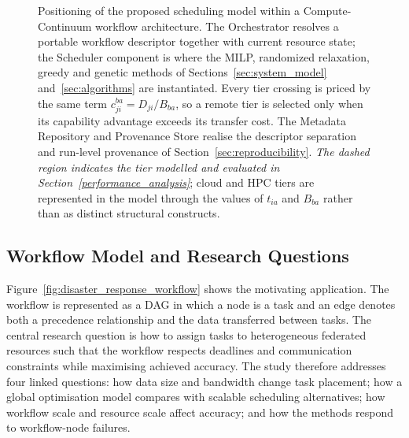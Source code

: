 \begin{figure}[t]
\caption{Positioning of the proposed scheduling model within a Compute-Continuum workflow
architecture. The Orchestrator resolves a portable workflow descriptor together with current
resource state; the Scheduler component is where the MILP, randomized relaxation, greedy and
genetic methods of Sections~\ref{sec:system_model} and~\ref{sec:algorithms} are instantiated.
Every tier crossing is priced by the same term $c_{ji}^{ba}=D_{ji}/B_{ba}$, so a remote tier is
selected only when its capability advantage exceeds its transfer cost. The Metadata Repository
and Provenance Store realise the descriptor separation and run-level provenance of
Section~\ref{sec:reproducibility}. \emph{The dashed region indicates the tier modelled and
evaluated in Section~\ref{performance_analysis}}; cloud and HPC tiers are represented in the
model through the values of $t_{ia}$ and $B_{ba}$ rather than as distinct structural constructs.}
\label{fig:compute_continuum_architecture}
\end{figure}

\subsection{Workflow Model and Research Questions}

Figure~\ref{fig:disaster_response_workflow} shows the motivating application. The workflow is represented as a DAG in which a node is a task and an edge denotes both a precedence relationship and the data transferred between tasks. The central research question is how to assign tasks to heterogeneous federated resources such that the workflow respects deadlines and communication constraints while maximising achieved accuracy. The study therefore addresses four linked questions: how data size and bandwidth change task placement; how a global optimisation model compares with scalable scheduling alternatives; how workflow scale and resource scale affect accuracy; and how the methods respond to workflow-node failures.

